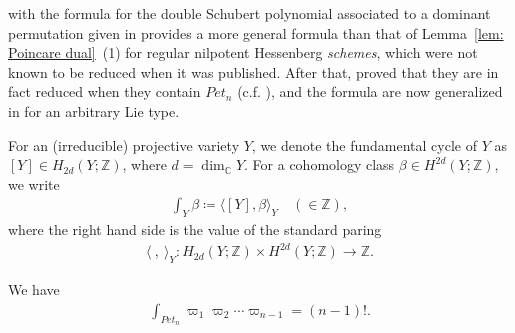\begin{rema}
{\rm
\cite[Corollary~7.2]{an-ty} with the formula for the double Schubert polynomial associated to a dominant permutation given in \cite[p.2613]{an-ty} provides a more general formula than that of Lemma~\ref{lem: Poincare dual}~(1) for regular nilpotent Hessenberg \textit{schemes}, which were not known to be reduced when it was published. After that, \cite{ab-de-ga-ha} proved that they are in fact reduced when they contain $Pet_{n}$ (c.f. \cite[Remark~3.8]{ab-de-ga-ha}), and the formula are now generalized in \cite{ab-fu-ze} for an arbitrary Lie type.
}
\end{rema}

For an (irreducible) projective variety $Y$, we denote the fundamental cycle of $Y$ as $[Y]\in H_{2d}(Y;{\mathbb Z})$, where $d=\dim_{{\mathbb C}} Y$. For a cohomology class $\beta\in H^{2d}(Y;{\mathbb Z})$, we write
\begin{align*}
\int_Y \beta \coloneqq \langle [Y] , \beta \rangle_{Y} \quad (\in{\mathbb Z}), 
\end{align*} 
where the right hand side is the value of the standard paring
\begin{align*}
\langle \ , \ \rangle_{Y} \colon  H_{2d}(Y;{\mathbb Z}) \times H^{2d}(Y;{\mathbb Z}) \rightarrow {\mathbb Z}.
\end{align*}

\begin{prop}\label{lem: Masuda lemma in fund}
We have
\begin{align*}
\int_{Pet_{n}}\varpi_1\varpi_2\cdots \varpi_{n-1} = (n-1)! .
\end{align*}
\end{prop}

